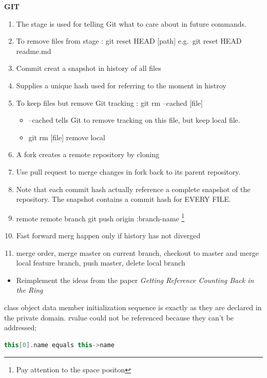 \documentclass[a4paper]{tufte-handout}
\begin{document}
\textbf{GIT}
\begin{enumerate}
\item The stage is used for telling Git what to care about in future commands.
\item To remove files from stage : git reset  HEAD [path] e.g.\ git reset HEAD readme.md
\item Commit creat a snapshot in history of all files
\item Supplies a unique hash used for referring to the moment in histroy
\item To keep files but remove Git tracking : git rm --cached [file]
  \begin{itemize}
  \item --cached tells Git to remove tracking on this file, but keep local file.
  \item git rm [file] remove local
  \end{itemize}
\item A fork creates a remote repository by cloning
\item Use pull request to merge changes in fork back to its parent repository.
\item Note that each commit hash actually reference a complete snapshot of the repository. The snapshot contains a commit hash for EVERY FILE.
\item remote remote branch git push origin :{branch-name} \footnote {Pay attention to the space positon}
\item Fast forward merg happen only if history has not diverged
  \item merge order, merge master on current branch, checkout to master and merge local feature branch, push master, delete local branch
\end{enumerate}
\begin{maybe}
  \begin{itemize}
  \item Reimplement the ideas from the paper \textit{Getting Reference Counting Back in the Ring} \citep{Shahriyar+12}
  \end{itemize}
\end{maybe}


class object data member initialization sequence is exactly as they are declared in the private domain.
rvalue could not be referenced because they can't be addressed;
\begin{lstlisting}[language=c++]
this[0].name equals this->name
\end{lstlisting}
\end{document}
